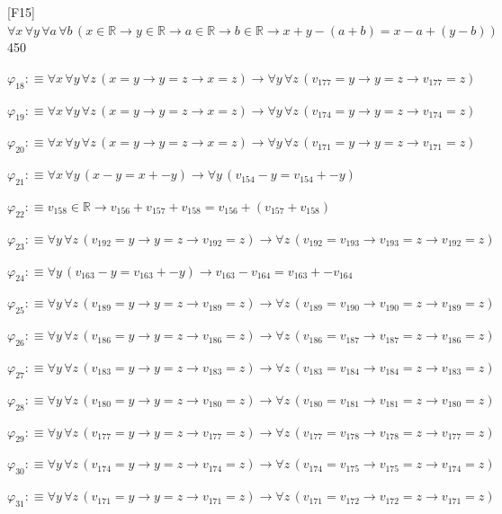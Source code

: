\begin{fullproof}{[F15]}{$\forall x\,\forall y\,\forall a\,\forall b\,(x \in \mathbb{R} \to y \in \mathbb{R} \to a \in \mathbb{R} \to b \in \mathbb{R} \to x + y - (a + b) = x - a + (y - b))$}{450}
\begin{abbrevlist}
\item $\varphi_{18} :\equiv \forall x\,\forall y\,\forall z\,(x = y \to y = z \to x = z) \to \forall y\,\forall z\,(v_{177} = y \to y = z \to v_{177} = z)$
\item $\varphi_{19} :\equiv \forall x\,\forall y\,\forall z\,(x = y \to y = z \to x = z) \to \forall y\,\forall z\,(v_{174} = y \to y = z \to v_{174} = z)$
\item $\varphi_{20} :\equiv \forall x\,\forall y\,\forall z\,(x = y \to y = z \to x = z) \to \forall y\,\forall z\,(v_{171} = y \to y = z \to v_{171} = z)$
\item $\varphi_{21} :\equiv \forall x\,\forall y\,(x - y = x + -y) \to \forall y\,(v_{154} - y = v_{154} + -y)$
\item $\varphi_{22} :\equiv v_{158} \in \mathbb{R} \to v_{156} + v_{157} + v_{158} = v_{156} + (v_{157} + v_{158})$
\item $\varphi_{23} :\equiv \forall y\,\forall z\,(v_{192} = y \to y = z \to v_{192} = z) \to \forall z\,(v_{192} = v_{193} \to v_{193} = z \to v_{192} = z)$
\item $\varphi_{24} :\equiv \forall y\,(v_{163} - y = v_{163} + -y) \to v_{163} - v_{164} = v_{163} + -v_{164}$
\item $\varphi_{25} :\equiv \forall y\,\forall z\,(v_{189} = y \to y = z \to v_{189} = z) \to \forall z\,(v_{189} = v_{190} \to v_{190} = z \to v_{189} = z)$
\item $\varphi_{26} :\equiv \forall y\,\forall z\,(v_{186} = y \to y = z \to v_{186} = z) \to \forall z\,(v_{186} = v_{187} \to v_{187} = z \to v_{186} = z)$
\item $\varphi_{27} :\equiv \forall y\,\forall z\,(v_{183} = y \to y = z \to v_{183} = z) \to \forall z\,(v_{183} = v_{184} \to v_{184} = z \to v_{183} = z)$
\item $\varphi_{28} :\equiv \forall y\,\forall z\,(v_{180} = y \to y = z \to v_{180} = z) \to \forall z\,(v_{180} = v_{181} \to v_{181} = z \to v_{180} = z)$
\item $\varphi_{29} :\equiv \forall y\,\forall z\,(v_{177} = y \to y = z \to v_{177} = z) \to \forall z\,(v_{177} = v_{178} \to v_{178} = z \to v_{177} = z)$
\item $\varphi_{30} :\equiv \forall y\,\forall z\,(v_{174} = y \to y = z \to v_{174} = z) \to \forall z\,(v_{174} = v_{175} \to v_{175} = z \to v_{174} = z)$
\item $\varphi_{31} :\equiv \forall y\,\forall z\,(v_{171} = y \to y = z \to v_{171} = z) \to \forall z\,(v_{171} = v_{172} \to v_{172} = z \to v_{171} = z)$

\end{abbrevlist}
\end{fullproof}
